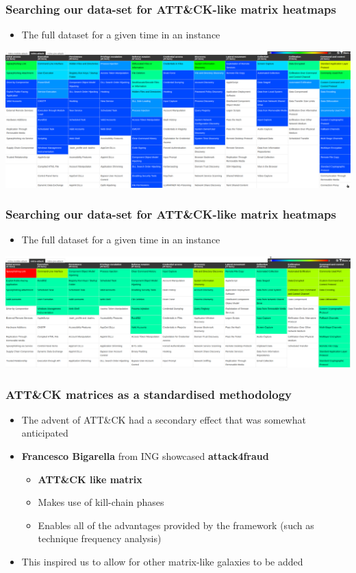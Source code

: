 \begin{frame}
  \frametitle{Searching our data-set for ATT\&CK-like matrix heatmaps}
  \begin{itemize}
    \item The full dataset for a given time in an instance
  \end{itemize}
  \includegraphics[scale=0.18]{matrix.png}
\end{frame}

\begin{frame}
  \frametitle{Searching our data-set for ATT\&CK-like matrix heatmaps}
  \begin{itemize}
    \item The full dataset for a given time in an instance
  \end{itemize}
  \includegraphics[scale=0.18]{matrix2.png}
\end{frame}

\begin{frame}
  \frametitle{ATT\&CK matrices as a standardised methodology}
  \begin{itemize}
    \item The advent of ATT\&CK had a secondary effect that was somewhat anticipated
    \item {\bf Francesco Bigarella} from ING showcased {\bf attack4fraud}
    \begin{itemize}
      \item {\bf ATT\&CK like matrix}
      \item Makes use of kill-chain phases 
      \item Enables all of the advantages provided by the framework (such as technique frequency analysis)
    \end{itemize}
    \item This inspired us to allow for other matrix-like galaxies to be added
  \end{itemize}
\end{frame}


